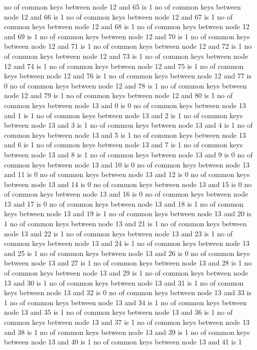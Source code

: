no of common keys between node 12 and 65 is 1
no of common keys between node 12 and 66 is 1
no of common keys between node 12 and 67 is 1
no of common keys between node 12 and 68 is 1
no of common keys between node 12 and 69 is 1
no of common keys between node 12 and 70 is 1
no of common keys between node 12 and 71 is 1
no of common keys between node 12 and 72 is 1
no of common keys between node 12 and 73 is 1
no of common keys between node 12 and 74 is 1
no of common keys between node 12 and 75 is 1
no of common keys between node 12 and 76 is 1
no of common keys between node 12 and 77 is 0
no of common keys between node 12 and 78 is 1
no of common keys between node 12 and 79 is 1
no of common keys between node 12 and 80 is 1
no of common keys between node 13 and 0 is 0
no of common keys between node 13 and 1 is 1
no of common keys between node 13 and 2 is 1
no of common keys between node 13 and 3 is 1
no of common keys between node 13 and 4 is 1
no of common keys between node 13 and 5 is 1
no of common keys between node 13 and 6 is 1
no of common keys between node 13 and 7 is 1
no of common keys between node 13 and 8 is 1
no of common keys between node 13 and 9 is 0
no of common keys between node 13 and 10 is 0
no of common keys between node 13 and 11 is 0
no of common keys between node 13 and 12 is 0
no of common keys between node 13 and 14 is 0
no of common keys between node 13 and 15 is 0
no of common keys between node 13 and 16 is 0
no of common keys between node 13 and 17 is 0
no of common keys between node 13 and 18 is 1
no of common keys between node 13 and 19 is 1
no of common keys between node 13 and 20 is 1
no of common keys between node 13 and 21 is 1
no of common keys between node 13 and 22 is 1
no of common keys between node 13 and 23 is 1
no of common keys between node 13 and 24 is 1
no of common keys between node 13 and 25 is 1
no of common keys between node 13 and 26 is 0
no of common keys between node 13 and 27 is 1
no of common keys between node 13 and 28 is 1
no of common keys between node 13 and 29 is 1
no of common keys between node 13 and 30 is 1
no of common keys between node 13 and 31 is 1
no of common keys between node 13 and 32 is 0
no of common keys between node 13 and 33 is 1
no of common keys between node 13 and 34 is 1
no of common keys between node 13 and 35 is 1
no of common keys between node 13 and 36 is 1
no of common keys between node 13 and 37 is 1
no of common keys between node 13 and 38 is 1
no of common keys between node 13 and 39 is 1
no of common keys between node 13 and 40 is 1
no of common keys between node 13 and 41 is 1
